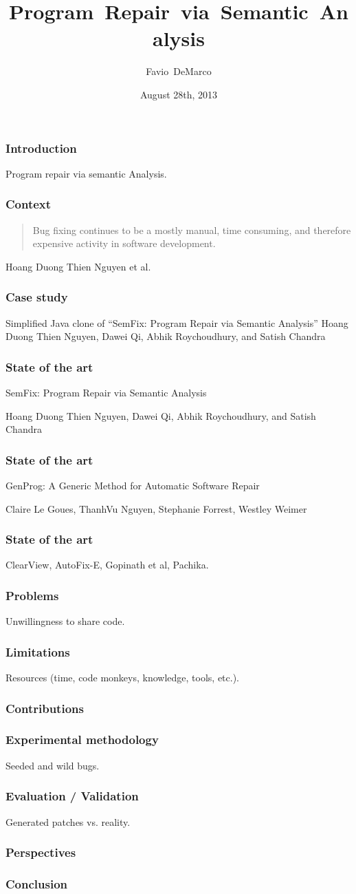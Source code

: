 \documentclass{beamer}
\title
  [Program Repair via Semantic Analysis]
  {Program~Repair~via~Semantic~Analysis}
\author[DeMarco]{Favio~DeMarco}
\institute[U.B.A. - INRIA]{Universidad de Buenos Aires - INRIA}
\date[08/28/2013]{August 28th, 2013}
\begin{document}
\frame
  {
    \titlepage
  }

  \frame
  {
    \frametitle{Introduction}
    Program repair via semantic Analysis.
  }

  \frame
  {
    \frametitle{Context}
    \begin{quote}
    Bug fixing continues to be a mostly manual, time consuming, and therefore expensive activity in software development.
    \end{quote}
    Hoang Duong Thien Nguyen et al.
}

  \frame
  {
    \frametitle{Case study}
    Simplified Java clone of ``SemFix: Program Repair via Semantic Analysis''
Hoang Duong Thien Nguyen, Dawei Qi, Abhik Roychoudhury, and Satish Chandra
  }

{
  \frame
  {
    \frametitle{State of the art}
    SemFix: Program Repair via Semantic Analysis

Hoang Duong Thien Nguyen, Dawei Qi, Abhik Roychoudhury, and Satish Chandra
  }
}

{
  \frame
  {
    \frametitle{State of the art}
    GenProg: A Generic Method for Automatic Software Repair
    
Claire Le Goues, ThanhVu Nguyen, Stephanie Forrest, Westley Weimer
  }
}

{
  \frame
  {
    \frametitle{State of the art}
    ClearView, AutoFix-E, Gopinath et al, Pachika.
  }
}

  \frame
  {
    \frametitle{Problems}
    Unwillingness to share code.
  }
  
  \frame
  {
    \frametitle{Limitations}
    Resources (time, code monkeys, knowledge, tools, etc.).
  }

  \frame
  {
    \frametitle{Contributions}
  }


  \frame
  {
    \frametitle{Experimental methodology}
    Seeded and wild bugs.
  }
  
  \frame
  {
    \frametitle{Evaluation / Validation}
    Generated patches vs. reality.
  }
  
  \frame
  {
    \frametitle{Perspectives}
    
  }
  
  \frame
  {
    \frametitle{Conclusion}
    
  }
  
\end{document}
